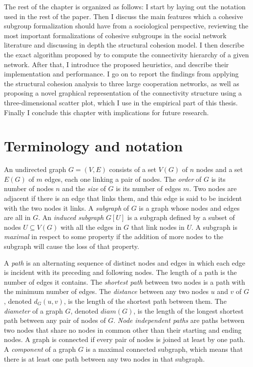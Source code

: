 The rest of the chapter is organized as follows: I start by laying out the notation used in the rest of the paper. Then I discuss the main features which a cohesive subgroup formalization should have from a sociological perspective, reviewing the most important formalizations of cohesive subgroups in the social network literature and discussing in depth the structural cohesion model. I then describe the exact algorithm proposed by \citet{moody:2003} to compute the connectivity hierarchy of a given network. After that, I introduce the proposed heuristics, and describe their implementation and performance. I go on to report the findings from applying the structural cohesion analysis to three large cooperation networks, as well as proposing a novel graphical representation of the connectivity structure using a three-dimensional scatter plot, which I use in the empirical part of this thesis. Finally I conclude this chapter with implications for future research.

\section{Terminology and notation}

An undirected graph $G=(V,E)$ consists of a set $V(G)$ of $n$ nodes and a set $E(G)$ of $m$ edges, each one linking a pair of nodes. The \emph{order} of $G$ is its number of nodes $n$ and the \emph{size} of $G$ is its number of edges $m$. Two nodes are adjacent if there is an edge that links them, and this edge is said to be incident with the two nodes it links. A \emph{subgraph} of $G$ is a graph whose nodes and edges are all in $G$. An \emph{induced subgraph} $G[U]$ is a subgraph defined by a subset of nodes $U \subseteq V(G)$ with all the edges in $G$ that link nodes in $U$. A subgraph is \emph{maximal} in respect to some property if the addition of more nodes to the subgraph will cause the loss of that property.

A \emph{path} is an alternating sequence of distinct nodes and edges in which each edge is incident with its preceding and following nodes. The length of a path is the number of edges it contains. The \emph{shortest path} between two nodes is a path with the minimum number of edges. The \emph{distance} between any two nodes $u$ and $v$ of $G$, denoted $d_{G}(u,v)$, is the length of the shortest path between them. The \emph{diameter} of a graph $G$, denoted $diam(G)$, is the length of the longest shortest path between any pair of nodes of $G$. \emph{Node independent paths} are paths between two nodes that share no nodes in common other than their starting and ending nodes. A graph is connected if every pair of nodes is joined at least by one path. A \emph{component} of a graph $G$ is a maximal connected subgraph, which means that there is at least one path between any two nodes in that subgraph.

